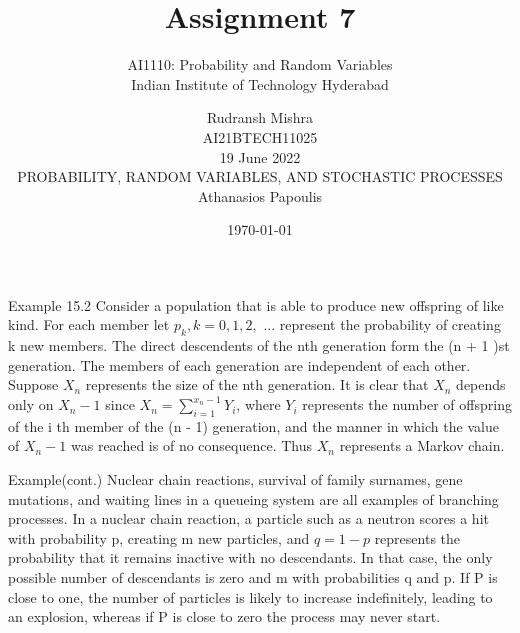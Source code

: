 \documentclass{beamer}
\title{Assignment 7}
\subtitle{\Large AI1110: Probability and Random Variables \\ \large Indian Institute of Technology Hyderabad}
\author{Rudransh Mishra \\ \normalsize AI21BTECH11025 \\ \vspace*{20pt} \normalsize  19 June 2022 \\ \vspace*{20pt} PROBABILITY, RANDOM VARIABLES, AND STOCHASTIC PROCESSES\\ \normalsize Athanasios Papoulis}
\date{\today}
\begin{document}
\begin{frame}
    \titlepage 
\end{frame}

\logo{}


\begin{frame}{Example 15.2}
Consider a population that is able to produce new offspring of like kind. For each member let $p_k, k = 0, 1, 2,$ ... represent the probability of creating k new members. The direct descendents of the nth generation form the (n + 1 )st generation. The members of each generation are independent of each other. Suppose $X_n$ represents the size of the nth generation. It is clear that $X_n$ depends only on $X_n-1$ since $X_n = \sum_{i=1}^{x_n-1}Y_i$, where $Y_i$ represents the number of offspring of the i th member of the (n - 1) generation, and the manner in which the value of $X_n-1$ was reached is of no consequence. Thus $X_n$ represents a Markov chain.
\end{frame}

\begin{frame}{Example(cont.)}
Nuclear chain reactions, survival of family surnames, gene mutations, and waiting lines in a queueing system are all examples of branching processes. In a nuclear chain reaction, a particle such as a neutron scores a hit with probability p, creating m new particles, and $q = 1-p$ represents the probability that it remains inactive with no descendants. In that case, the only possible number of descendants is zero and m with probabilities q and p. If P is close to one, the number of particles is likely to increase indefinitely, leading to an explosion, whereas if P is close to zero the process may never start.
\end{frame}
\end{document}
